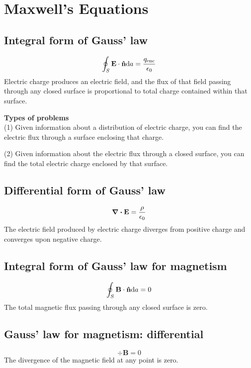 \section{Maxwell's Equations}

\subsection*{Integral form of Gauss' law}
\begin{equation*}
    \oint_S \mathbf{E} \cdot \mathbf{\hat{n}} \differential a = \frac{q_\textrm{enc}}{\epsilon_0}
  \end{equation*}
Electric charge produces an electric field, and the flux of that field passing through any closed surface is 
proportional to total charge contained within that surface.

\textbf{Types of problems} \\
(1) Given information about a distribution of electric charge, you can find the electric flux through a surface enclosing that charge.

(2) Given information about the electric flux through a closed surface, you can find the total electric charge enclosed by that surface.

  \subsection*{Differential form of Gauss' law}
  \begin{equation*}
    \divergence \mathbf{E} = \frac{\rho}{\epsilon_0}
  \end{equation*}
  The electric field produced by electric charge diverges from positive charge and converges upon negative charge.

\subsection*{Integral form of Gauss' law for magnetism}
\begin{equation*}
    \oint_S \mathbf{B} \cdot \mathbf{\hat{n}} \differential a = 0
  \end{equation*}
  The total magnetic flux passing through any closed surface is zero.

\subsection*{Gauss' law for magnetism: differential}
\begin{equation*}
    \div \mathbf{B} = 0
\end{equation*}
The divergence of the magnetic field at any point is zero.

